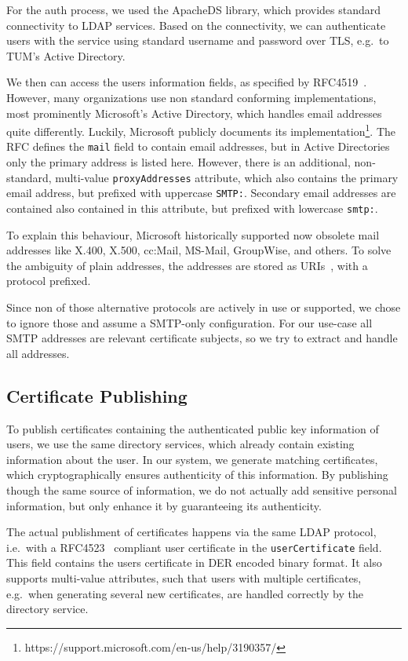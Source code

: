 For the auth process, we used the ApacheDS library, which provides standard connectivity to LDAP services.
Based on the connectivity, we can authenticate users with the service using standard username and password over TLS,
e.g.\ to TUM's Active Directory.

We then can access the users information fields, as specified by RFC4519~\cite{RFC4519}.
However, many organizations use non standard conforming implementations, most prominently Microsoft's Active Directory,
which handles email addresses quite differently.
Luckily, Microsoft publicly documents its implementation\footnote{https://support.microsoft.com/en-us/help/3190357/}.
The RFC defines the \lstinline{mail} field to contain email addresses, but in Active Directories only the primary
address is listed here.
However, there is an additional, non-standard, multi-value \lstinline{proxyAddresses} attribute, which also contains the
primary email address, but prefixed with uppercase \lstinline{SMTP:}.
Secondary email addresses are contained also contained in this attribute, but prefixed with lowercase \lstinline{smtp:}.

To explain this behaviour, Microsoft historically supported now obsolete mail addresses like X.400, X.500, cc:Mail,
MS-Mail, GroupWise, and others.
To solve the ambiguity of plain addresses, the addresses are stored as URIs~\cite{RFC3986}, with a protocol prefixed.

Since non of those alternative protocols are actively in use or supported, we chose to ignore those and assume a
SMTP-only configuration.
For our use-case all SMTP addresses are relevant certificate subjects, so we try to extract and handle all addresses.

\subsection*{Certificate Publishing}
To publish certificates containing the authenticated public key information of users, we use the same directory
services, which already contain existing information about the user.
In our system, we generate matching certificates, which cryptographically ensures authenticity of this information.
By publishing though the same source of information, we do not actually add sensitive personal information, but only
enhance it by guaranteeing its authenticity.

The actual publishment of certificates happens via the same LDAP protocol, i.e.\ with a RFC4523~\cite{RFC4523} compliant
user certificate in the \lstinline{userCertificate} field.
This field contains the users certificate in DER encoded binary format.
It also supports multi-value attributes, such that users with multiple certificates, e.g.\ when generating several new
certificates, are handled correctly by the directory service.

